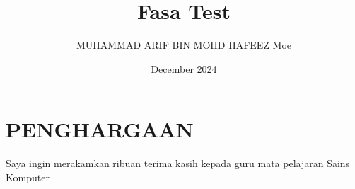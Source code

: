 \documentclass[a4paper, 12pt]{report}
\title{Fasa Test}
\author{MUHAMMAD ARIF BIN MOHD HAFEEZ Moe}
\date{December 2024}
\newcommand{\Besar}{\fontsize{14pt}{1.5}\selectfont}
\begin{document}
\section*{\centering\Besar PENGHARGAAN}

\begin{center}
    Saya ingin merakamkan ribuan terima kasih kepada guru mata pelajaran Sains Komputer 
\end{center}

\newpage

\tableofcontents
\end{document}
